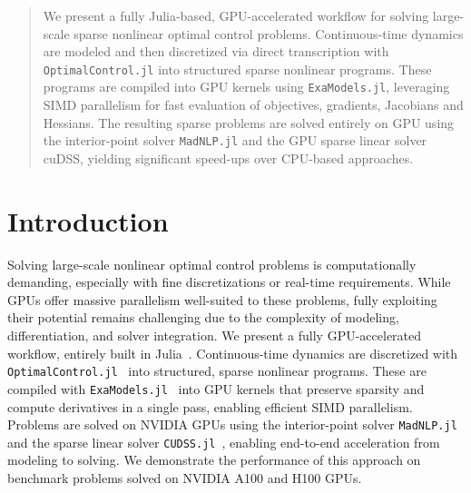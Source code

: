 \begin{abstract}
    We present a fully Julia-based, GPU-accelerated workflow for solving large-scale sparse nonlinear optimal control problems.
    Continuous-time dynamics are modeled and then discretized via direct transcription with \texttt{OptimalControl.jl} into structured sparse nonlinear programs.
    These programs are compiled into GPU kernels using \texttt{ExaModels.jl}, leveraging SIMD parallelism for fast evaluation of objectives, gradients, Jacobians and Hessians.
    The resulting sparse problems are solved entirely on GPU using the interior-point solver \texttt{MadNLP.jl} and the GPU sparse linear solver cuDSS, yielding significant speed-ups over CPU-based approaches.
\end{abstract}




\section{Introduction}

Solving large-scale nonlinear optimal control problems is computationally demanding, especially with fine discretizations or real-time requirements.  
While GPUs offer massive parallelism well-suited to these problems, fully exploiting their potential remains challenging due to the complexity of modeling, differentiation, and solver integration.
%
We present a fully GPU-accelerated workflow, entirely built in Julia~\cite{bezanson2017julia}.
Continuous-time dynamics are discretized with \texttt{OptimalControl.jl}~\cite{OC_jl} into structured, sparse nonlinear programs.  
These are compiled with \texttt{ExaModels.jl}~\cite{shin2024accelerating} into GPU kernels that preserve sparsity and compute derivatives in a single pass, enabling efficient SIMD parallelism.
%
Problems are solved on NVIDIA GPUs using the interior-point solver \texttt{MadNLP.jl}~\cite{shin2021graph} and the sparse linear solver \texttt{CUDSS.jl}~\cite{Montoison_CUDSS_jl_Julia_interface}, enabling end-to-end acceleration from modeling to solving.
%
We demonstrate the performance of this approach on benchmark problems solved on NVIDIA A100 and H100 GPUs.

